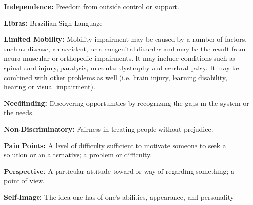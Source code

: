   \item \textbf{Independence:} Freedom from outside control or support.
  \item \textbf{Libras:} Brazilian Sign Language
  \item \textbf{Limited Mobility:} Mobility impairment may be caused by a number of factors, such as disease, an accident, or a congenital disorder and may be the result from neuro-muscular or orthopedic impairments. It may include conditions such as spinal cord injury, paralysis, muscular dystrophy and cerebral palsy. It may be combined with other problems as well (i.e. brain injury, learning disability, hearing or visual impairment).
  \item \textbf{Needfinding:} Discovering opportunities by recognizing the gaps in the system or the needs.
  \item \textbf{Non-Discriminatory:} Fairness in treating people without prejudice.
  \item \textbf{Pain Points:} A level of difficulty sufficient to motivate someone to seek a solution or an alternative; a problem or difficulty.
  \item \textbf{Perspective:} A particular attitude toward or way of regarding something; a point of view.
  \item \textbf{Self-Image:} The idea one has of one's abilities, appearance, and personality
